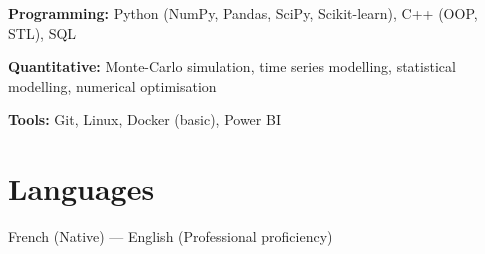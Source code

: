 \documentclass[10pt, letterpaper]{article}
\begin{document}
\textbf{Programming:} Python (NumPy, Pandas, SciPy, Scikit-learn), C++ (OOP, STL), SQL

\textbf{Quantitative:} Monte-Carlo simulation, time series modelling, statistical modelling, numerical optimisation

\textbf{Tools:} Git, Linux, Docker (basic), Power BI

\section*{Languages}

French (Native) — English (Professional proficiency)
\end{document}
